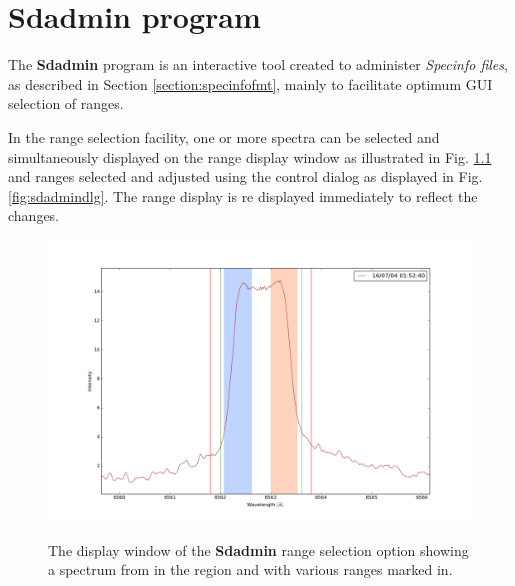 \chapter{Sdadmin program} %
\protect\label{chapter:sdadmin}

The \textbf{Sdadmin} program is an interactive tool created to administer \textit{Specinfo files}, as described in
Section \ref{section:specinfofmt}, mainly to facilitate optimum GUI selection of ranges.

In the range selection facility, one or more spectra can be selected and simultaneously displayed on the range display
window as illustrated in Fig. \ref{fig:sdadminfig} and ranges selected and adjusted using the control dialog as
displayed in Fig. \ref{fig:sdadmindlg}. The range display is re displayed immediately to reflect the changes.

\begin{figure}[!htbp]
\begin{center}
\includegraphics[scale=0.4]{Figures/sdadminfig.png} \\
\end{center}   
\caption{The display window of the \textbf{Sdadmin} range selection option showing a {\prox} spectrum from {\harps} in
  the {\ha} region and with various ranges marked in.}
 \protect\label{fig:sdadminfig}
\end{figure}

